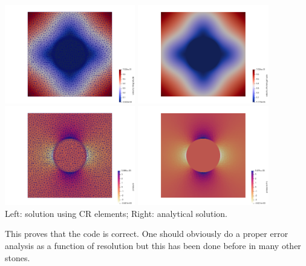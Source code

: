 \begin{center}
\includegraphics[width=5.7cm]{python_codes/fieldstone_142/results/case0/vel}
\includegraphics[width=5.7cm]{python_codes/fieldstone_142/results/case0/vel_th}\\
\includegraphics[width=5.7cm]{python_codes/fieldstone_142/results/case0/press}
\includegraphics[width=5.7cm]{python_codes/fieldstone_142/results/case0/press_th}\\
{\captionfont Left: solution using CR elements; Right: analytical solution.}
\end{center}

This proves that the code is correct. One should obviously do a proper error analysis as a function 
of resolution but this has been done before in many other stones. 

